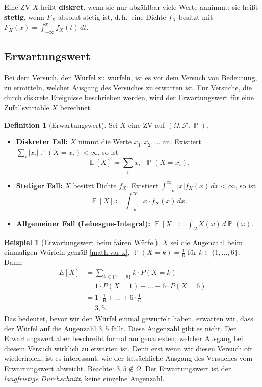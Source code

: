 ﻿\documentclass[12pt,a4paper]{article}
\theoremstyle{definition}
\newtheorem{definition}{Definition}[section]
\newtheorem{beispiel}{Beispiel}[section]
\theoremstyle{plain}
\theoremstyle{remark}
\DeclareMathOperator{\E}{\mathbb{E}}
\DeclareMathOperator{\Prob}{\mathbb{P}}
\begin{document}
Eine ZV $X$ heißt \textbf{diskret}, wenn sie nur abzählbar viele Werte annimmt;
sie heißt \textbf{stetig}, wenn $F_X$ absolut stetig ist, d.\,h.\ eine
Dichte $f_X$ besitzt mit $F_X(x) = \int_{-\infty}^{x} f_X(t)\,dt$.

\subsection{Erwartungswert}

Bei dem Versuch, den Würfel zu würfeln, ist es vor dem Versuch von Bedeutung,
zu ermitteln, welcher Ausgang des Versuches zu erwarten ist. Für Versuche,
die durch diskrete Ereignisse beschrieben werden, wird der Erwartungswert
für eine Zufallsvariable $X$ berechnet.

\begin{definition}[Erwartungswert]\label{def:ew}
  Sei $X$ eine ZV auf $(\Omega, \mathcal{F}, \Prob)$.
  \begin{itemize}
    \item \textbf{Diskreter Fall:} $X$ nimmt die Werte $x_1, x_2, \ldots$ an.
      Existiert $\sum_i |x_i| \Prob(X = x_i) < \infty$, so ist
      \[
        \E[X] \coloneqq \sum_{i} x_i \cdot \Prob(X = x_i).
      \]
    \item \textbf{Stetiger Fall:} $X$ besitzt Dichte $f_X$. Existiert
      $\int_{-\infty}^{\infty} |x| f_X(x)\,dx < \infty$, so ist
      \[
        \E[X] \coloneqq \int_{-\infty}^{\infty} x \cdot f_X(x)\,dx.
      \]
    \item \textbf{Allgemeiner Fall (Lebesgue-Integral):}
      $\E[X] \coloneqq \int_\Omega X(\omega)\,d\Prob(\omega)$.
  \end{itemize}
\end{definition}

\begin{beispiel}[Erwartungswert beim fairen Würfel]\label{bsp:ewwuerfel}
  $X$ sei die Augenzahl beim einmaligen Würfeln gemäß \eqref{math:var-x},
  $\Prob(X=k)=\frac{1}{6}$ für $k \in \{1,\ldots,6\}$. Dann:
  \begin{align}
    E[X] &= \sum_{k \in \{1, \ldots, 6\}} k \cdot P(X = k) \\
         &= 1 \cdot P(X = 1) + \ldots + 6 \cdot P(X = 6) \\
         &= 1 \cdot \frac{1}{6} + \ldots + 6 \cdot \frac{1}{6} \\
         &= 3{,}5.
  \end{align}
  Das bedeutet, bevor wir den Würfel einmal gewürfelt haben, erwarten wir,
  dass der Würfel auf die Augenzahl $3{,}5$ fällt. Diese Augenzahl gibt es
  nicht. Der Erwartungswert aber beschreibt formal am genauesten, welcher
  Ausgang bei diesem Versuch wirklich zu erwarten ist. Denn erst wenn wir
  diesen Versuch oft wiederholen, ist es interessant, wie der tatsächliche
  Ausgang des Versuches vom Erwartungswert abweicht. Beachte:
  $3{,}5 \notin \Omega$. Der Erwartungswert ist der \emph{langfristige
  Durchschnitt}, keine einzelne Augenzahl.
\end{beispiel}
\end{document}
